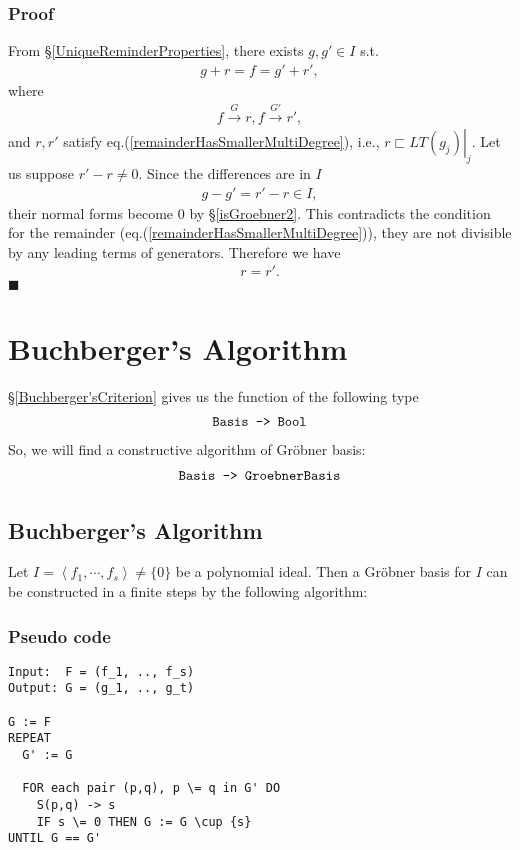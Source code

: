 \documentclass[11pt]{book}
\begin{document}
\subsubsection{Proof}
From \S\ref{UniqueReminderProperties}, there exists $g, g' \in I$ s.t.
\begin{eqnarray}
g + r = f = g' + r',
\end{eqnarray}
where 
\begin{eqnarray}
f \stackrel{G}{\to} r, f \stackrel{G'}{\to} r',
\end{eqnarray}
and $r,r'$ satisfy eq.(\ref{remainderHasSmallerMultiDegree}), i.e., $r \sqsubset \left. LT(g_j) \right|_j$.
Let us suppose $r' - r \neq 0$.
Since the differences are in $I$
\begin{eqnarray}
g - g' = r' - r \in I,
\end{eqnarray}
their normal forms become 0 by \S\ref{isGroebner2}.
This contradicts the condition for the remainder (eq.(\ref{remainderHasSmallerMultiDegree})), they are not divisible by any leading terms of generators.
Therefore we have 
\begin{eqnarray}
r = r'.
\end{eqnarray}
$\blacksquare$

\section{Buchberger's Algorithm}
\S\ref{Buchberger'sCriterion} gives us the function of the following type
\begin{eqnarray}
\verb|Basis -> Bool|
\end{eqnarray}
So, we will find a constructive algorithm of Gr\"obner basis:
\begin{eqnarray}
\verb|Basis -> GroebnerBasis|
\end{eqnarray}

\subsection{Buchberger's Algorithm}
Let $I = \left< f_1, \cdots, f_s \right> \neq \{0\}$ be a polynomial ideal.
Then a Gr\"obner basis for $I$ can be constructed in a finite steps by the following algorithm:

\subsubsection{Pseudo code}
\begin{verbatim}
Input:  F = (f_1, .., f_s)
Output: G = (g_1, .., g_t)

G := F
REPEAT
  G' := G
  
  FOR each pair (p,q), p \= q in G' DO
    S(p,q) -> s
    IF s \= 0 THEN G := G \cup {s}
UNTIL G == G'
\end{verbatim}
\end{document}
